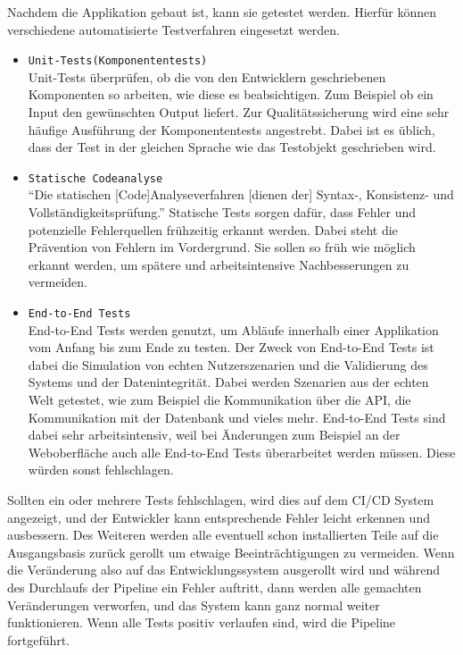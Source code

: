 Nachdem die Applikation gebaut ist, kann sie getestet werden. Hierfür können verschiedene automatisierte Testverfahren eingesetzt werden.
\begin{itemize}
	\item \texttt{Unit-Tests(Komponententests)} \\Unit-Tests überprüfen, ob die von den Entwicklern geschriebenen Komponenten so arbeiten, wie diese es beabsichtigen. Zum Beispiel ob ein Input den gewünschten Output liefert.\autocite[Vgl.][S.21]{Westphal.2012} Zur Qualitätssicherung wird eine sehr häufige Ausführung der Komponententests angestrebt. Dabei ist es üblich, dass der Test in der gleichen Sprache wie das Testobjekt geschrieben wird.
	\item  \texttt{Statische Codeanalyse}\\ \enquote{Die statischen [Code]Analyseverfahren [dienen der] Syntax-, Konsistenz- und Vollständigkeitsprüfung.}\autocite[S.264]{Bommer.2008} Statische Tests sorgen dafür, dass Fehler und potenzielle Fehlerquellen frühzeitig erkannt werden. Dabei steht die Prävention von Fehlern im Vordergrund. Sie sollen so früh wie möglich erkannt werden, um spätere und arbeitsintensive Nachbesserungen zu vermeiden.\autocite[Vgl.][S.263]{Bommer.2008}
	\item  \texttt{End-to-End Tests} \\End-to-End Tests werden genutzt, um Abläufe innerhalb einer Applikation vom Anfang bis zum Ende zu testen. Der Zweck von End-to-End Tests ist dabei die Simulation von echten Nutzerszenarien und die Validierung des Systems und der Datenintegrität.\autocite[Vgl.][S.250]{Bommer.2008} Dabei werden Szenarien aus der echten Welt getestet, wie zum Beispiel die Kommunikation über die API, die Kommunikation mit der Datenbank und vieles mehr. End-to-End Tests sind dabei sehr arbeitsintensiv, weil bei Änderungen zum Beispiel an der Weboberfläche auch alle End-to-End Tests überarbeitet werden müssen. Diese würden sonst fehlschlagen.\autocite[Vgl.][S.252]{Bommer.2008}
\end{itemize}
 Sollten ein oder mehrere Tests fehlschlagen, wird dies auf dem CI/CD System angezeigt, und der Entwickler kann entsprechende Fehler leicht erkennen und ausbessern. Des Weiteren werden alle eventuell schon installierten Teile auf die Ausgangsbasis zurück gerollt um etwaige Beeinträchtigungen zu vermeiden. Wenn die Veränderung also auf das Entwicklungssystem ausgerollt wird und während des Durchlaufs der Pipeline ein Fehler auftritt, dann werden alle gemachten Veränderungen verworfen, und das System kann ganz normal weiter funktionieren.\autocite[Vgl.][S.41]{Farley.2010} Wenn alle Tests positiv verlaufen sind, wird die Pipeline fortgeführt.\\
